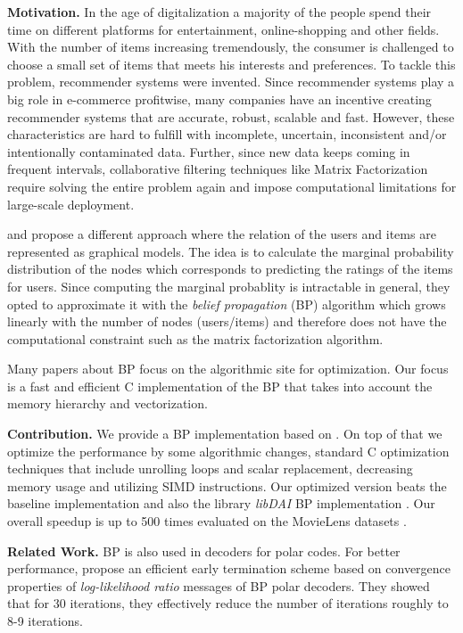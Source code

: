 \documentclass[letterpaper]{article}
\newcommand{\mypar}[1]{{\bf #1.}}
\begin{document}
\mypar{Motivation}
In the age of digitalization a majority of the people spend their time on different platforms for entertainment, online-shopping and other fields. With the number of items increasing tremendously, the consumer is challenged to choose a small set of items that meets his interests and preferences. To tackle this problem, recommender systems were invented. Since recommender systems play a big role in e-commerce profitwise, many companies have an incentive creating recommender systems that are accurate, robust, scalable and fast. However, these characteristics are hard to fulfill with incomplete, uncertain, inconsistent and/or intentionally contaminated data. Further, since new data keeps coming in frequent intervals, collaborative filtering techniques like Matrix Factorization require solving the entire problem again and impose computational limitations for large-scale deployment.

\citet{BPRS} and \citet{top-n-recommendation} propose a different approach where the relation of the users and items are represented as graphical models. The idea is to calculate the marginal probability distribution of the nodes which corresponds to predicting the ratings of the items for users. Since computing the marginal probablity is intractable in general, they opted to approximate it with the \emph{belief propagation} (BP) algorithm which grows linearly with the number of nodes (users/items) and therefore does not have the computational constraint such as the matrix factorization algorithm.

Many papers about BP focus on the algorithmic site for optimization. Our focus is a fast and efficient C implementation of the BP that takes into account the memory hierarchy and vectorization.

\mypar{Contribution}
We provide a BP implementation based on \citet{top-n-recommendation}. On top of that we optimize the performance by some algorithmic changes, standard C optimization techniques that include unrolling loops and scalar replacement, decreasing memory usage and utilizing SIMD instructions. Our optimized version beats the baseline implementation and also the library \emph{libDAI} BP implementation \cite{libdai}. Our overall speedup is up to 500 times evaluated on the MovieLens datasets \cite{movieLens}.

\mypar{Related Work}
BP is also used in decoders for polar codes. For better performance, \citet{related1} propose an efficient early termination scheme based on convergence properties of \emph{log-likelihood ratio} messages of BP polar decoders. They showed that for 30 iterations, they effectively reduce the number of iterations roughly to 8-9 iterations.
\end{document}
